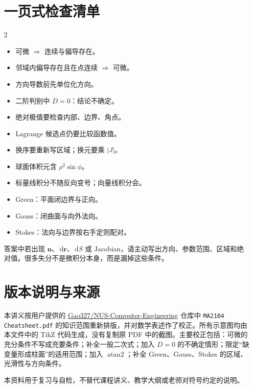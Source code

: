\documentclass[UTF8,a4paper,10pt,fontset=fandol]{ctexart}
\newcommand{\dd}{\,\mathrm{d}}
\newcommand{\vect}[1]{\mathbf{#1}}
\begin{document}
\section{一页式检查清单}

\begin{multicols}{2}
\begin{concept}[微分与优化]
\begin{itemize}
  \item 可微 $\Rightarrow$ 连续与偏导存在。
  \item 邻域内偏导存在且在点连续 $\Rightarrow$ 可微。
  \item 方向导数前先单位化方向。
  \item 二阶判别中 $D=0$：结论不确定。
  \item 绝对极值要检查内部、边界、角点。
  \item Lagrange 候选点仍要比较函数值。
\end{itemize}
\end{concept}

\columnbreak
\begin{condition}[积分与定理]
\begin{itemize}
  \item 换序要重新写区域；换元要乘 $|J|$。
  \item 球面体积元含 $\rho^2\sin\phi$。
  \item 标量线积分不随反向变号；向量线积分会。
  \item Green：平面闭边界与正向。
  \item Gauss：闭曲面与向外法向。
  \item Stokes：法向与边界按右手定则配对。
\end{itemize}
\end{condition}
\end{multicols}

\begin{warning}[最后一分钟自检]
答案中若出现 $\vect n$、$\dd\vect r$、$\dd S$ 或 Jacobian，请主动写出方向、参数范围、区域和绝对值。很多失分不是微积分本身，而是漏掉这些条件。
\end{warning}

\section*{版本说明与来源}
本讲义按用户提供的 \href{https://github.com/Gao327/NUS-Computer-Engineering}{Gao327/NUS-Computer-Engineering} 仓库中 \texttt{MA2104 Cheatsheet.pdf} 的知识范围重新排版，并对数学表述作了校正。所有示意图均由本文件中的 TikZ 代码生成，没有复制原 PDF 中的截图。主要校正包括：可微的充分条件不写成充要条件；补全一般二次式；加入 $D=0$ 的不确定情形；限定“缺变量形成柱面”的适用范围；加入 $\operatorname{atan2}$；补全 Green、Gauss、Stokes 的区域、光滑性与方向条件。

\vfill
{\small\color{muted}本资料用于复习与自检，不替代课程讲义、教学大纲或老师对符号约定的说明。}
\end{document}

